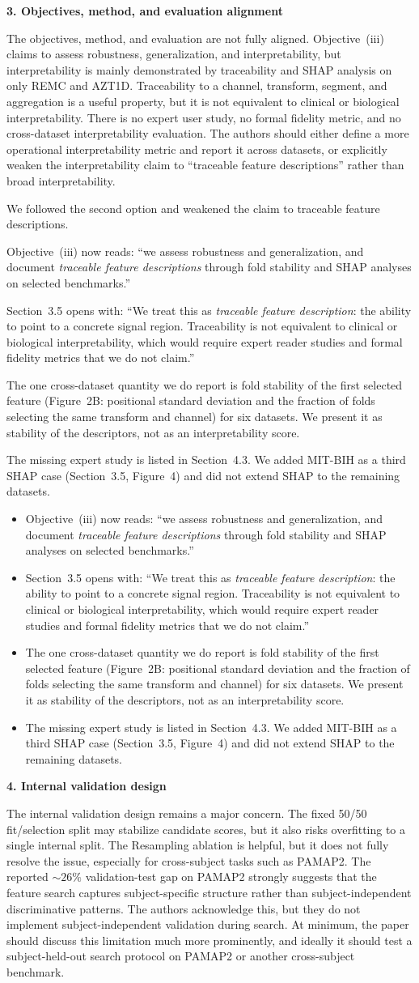 \documentclass[11pt]{article}
\makeatletter
\newcommand{\rsp}{\par\vspace{0.9em}}
\newcommand{\rcitem}[2]{\begin{reviewerbox}\textbf{#1}\par\smallskip#2\end{reviewerbox}}
\newcommand{\response}[2]{%
  \begin{responsebox}#1%
  \def\@responseitems{#2}%
  \ifx\@responseitems\empty\else\begin{itemize}[nosep,leftmargin=1.2em]#2\end{itemize}\fi
  \end{responsebox}\rsp}
\makeatother
\begin{document}
\rcitem{3. Objectives, method, and evaluation alignment}{The objectives, method, and evaluation are
not fully aligned. Objective~(iii) claims to assess robustness, generalization, and interpretability,
but interpretability is mainly demonstrated by traceability and SHAP analysis on only REMC and AZT1D.
Traceability to a channel, transform, segment, and aggregation is a useful property, but it is not
equivalent to clinical or biological interpretability. There is no expert user study, no formal
fidelity metric, and no cross-dataset interpretability evaluation. The authors should either define
a more operational interpretability metric and report it across datasets, or explicitly weaken the
interpretability claim to ``traceable feature descriptions'' rather than broad interpretability.}

\response{We followed the second option and weakened the claim to traceable feature descriptions.}{
  \item Objective~(iii) now reads: ``we assess robustness and generalization, and document
    \emph{traceable feature descriptions} through fold stability and SHAP analyses on selected
    benchmarks.''
  \item Section~3.5 opens with: ``We treat this as \emph{traceable feature description}: the ability
    to point to a concrete signal region. Traceability is not equivalent to clinical or biological
    interpretability, which would require expert reader studies and formal fidelity metrics that we
    do not claim.''
  \item The one cross-dataset quantity we do report is fold stability of the first selected feature
    (Figure~2B: positional standard deviation and the fraction of folds selecting the same transform
    and channel) for six datasets. We present it as stability of the descriptors, not as an
    interpretability score.
  \item The missing expert study is listed in Section~4.3. We added MIT-BIH as a third SHAP case
    (Section~3.5, Figure~4) and did not extend SHAP to the remaining datasets.
}

\rcitem{4. Internal validation design}{The internal validation design remains a major concern. The
fixed 50/50 fit/selection split may stabilize candidate scores, but it also risks overfitting to a
single internal split. The Resampling ablation is helpful, but it does not fully resolve the issue,
especially for cross-subject tasks such as PAMAP2. The reported ${\sim}26\%$ validation-test gap on
PAMAP2 strongly suggests that the feature search captures subject-specific structure rather than
subject-independent discriminative patterns. The authors acknowledge this, but they do not implement
subject-independent validation during search. At minimum, the paper should discuss this limitation
much more prominently, and ideally it should test a subject-held-out search protocol on PAMAP2 or
another cross-subject benchmark.}
\end{document}
